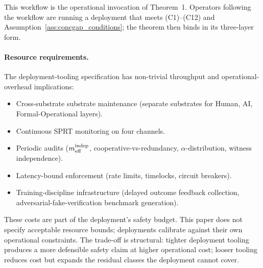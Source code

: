 This workflow is the operational invocation of Theorem~1. Operators
following the workflow are running a deployment that meets
(C1)--(C12) and Assumption~\ref{ass:concgap_conditions}; the
theorem then binds in its three-layer form.

\paragraph{Resource requirements.}
The deployment-tooling specification has non-trivial throughput and
operational-overhead implications:
\begin{itemize}
\item Cross-substrate substrate maintenance (separate substrates
  for Human, AI, Formal-Operational layers).
\item Continuous SPRT monitoring on four channels.
\item Periodic audits ($m_{\mathrm{eff}}^{\mathrm{indep}}$, cooperative-vs-redundancy,
  $\alpha$-distribution, witness independence).
\item Latency-bound enforcement (rate limits, timelocks, circuit
  breakers).
\item Training-discipline infrastructure (delayed outcome feedback
  collection, adversarial-fake-verification benchmark generation).
\end{itemize}
These costs are part of the deployment's safety budget.  This paper
does not specify acceptable resource bounds; deployments calibrate
against their own operational constraints.  The trade-off is
structural: tighter deployment tooling produces a more defensible
safety claim at higher operational cost; looser tooling reduces
cost but expands the residual classes the deployment cannot cover.
